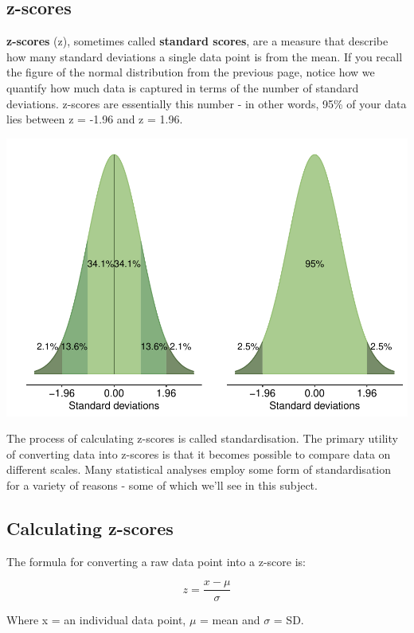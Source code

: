 \documentclass[
]{book}
\begin{document}
\hypertarget{z-scores-1}{%
\subsection{z-scores}\label{z-scores-1}}

\textbf{z-scores} (z), sometimes called \textbf{standard scores}, are a measure that describe how many standard deviations a single data point is from the mean. If you recall the figure of the normal distribution from the previous page, notice how we quantify how much data is captured in terms of the number of standard deviations. z-scores are essentially this number - in other words, 95\% of your data lies between z = -1.96 and z = 1.96.

\includegraphics{_main_files/figure-latex/unnamed-chunk-73-1.pdf}

The process of calculating z-scores is called standardisation. The primary utility of converting data into z-scores is that it becomes possible to compare data on different scales. Many statistical analyses employ some form of standardisation for a variety of reasons - some of which we'll see in this subject.

\hypertarget{calculating-z-scores}{%
\subsection{Calculating z-scores}\label{calculating-z-scores}}

The formula for converting a raw data point into a z-score is:

\[
z = \frac{x - \mu}{\sigma}
\]

Where x = an individual data point, \(\mu\) = mean and \(\sigma\) = SD.
\end{document}
